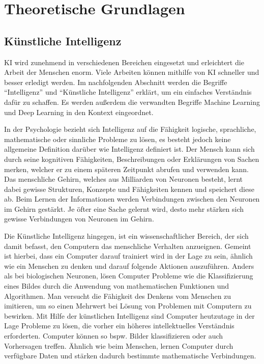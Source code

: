 \chapter{Theoretische Grundlagen}
\section{Künstliche Intelligenz}
\ac{KI} wird zunehmend in verschiedenen Bereichen eingesetzt und erleichtert die Arbeit der Menschen enorm. Viele Arbeiten können mithilfe von \ac{KI} schneller und besser erledigt werden. Im nachfolgenden Abschnitt werden die Begriffe ``Intelligenz'' und ``Künstliche Intelligenz'' erklärt, um ein einfaches Verständnis dafür zu schaffen. Es werden außerdem die verwandten Begriffe Machine Learning und Deep Learning in den Kontext eingeordnet.

In der Psychologie bezieht sich Intelligenz auf die Fähigkeit logische, sprachliche, mathematische oder sinnliche Probleme zu lösen, es besteht jedoch keine allgemeine Definition darüber wie Intelligenz definiert ist. Der Mensch kann sich durch seine kognitiven Fähigkeiten, Beschreibungen oder Erklärungen von Sachen merken, welcher er zu einem späteren Zeitpunkt abrufen und verwenden kann. Das menschliche Gehirn, welches aus Milliarden von Neuronen besteht, lernt dabei gewisse Strukturen, Konzepte und Fähigkeiten kennen und speichert diese ab. Beim Lernen der Informationen werden Verbindungen zwischen den Neuronen im Gehirn gestärkt. Je öfter eine Sache gelernt wird, desto mehr stärken sich gewisse Verbindungen von Neuronen im Gehirn. \cite[vgl.][]{Ertel2021,Posthoff2022}

Die Künstliche Intelligenz hingegen, ist ein wissenschaftlicher Bereich, der sich damit befasst, den Computern das menschliche Verhalten anzueignen. Gemeint ist hierbei, dass ein Computer darauf trainiert wird in der Lage zu sein, ähnlich wie ein Menschen zu denken und darauf folgende Aktionen auszuführen. \cite[vgl.][]{Lang2023} Anders als bei biologischen Neuronen, lösen Computer Probleme wie die Klassifizierung eines Bildes durch die Anwendung von mathematischen Funktionen und Algorithmen. Man versucht die Fähigkeit des Denkens vom Menschen zu imitieren, um so einen Mehrwert bei Lösung von Problemen mit Computern zu bewirken. Mit Hilfe der künstlichen Intelligenz sind Computer heutzutage in der Lage Probleme zu lösen, die vorher ein höheres intellektuelles Verständnis erforderten. Computer können so bspw. Bilder klassifizieren oder auch Vorhersagen treffen. Ähnlich wie beim Menschen, lernen Computer durch verfügbare Daten und stärken dadurch bestimmte mathematische Verbindungen. \cite[vgl.][]{WasIstKi}


